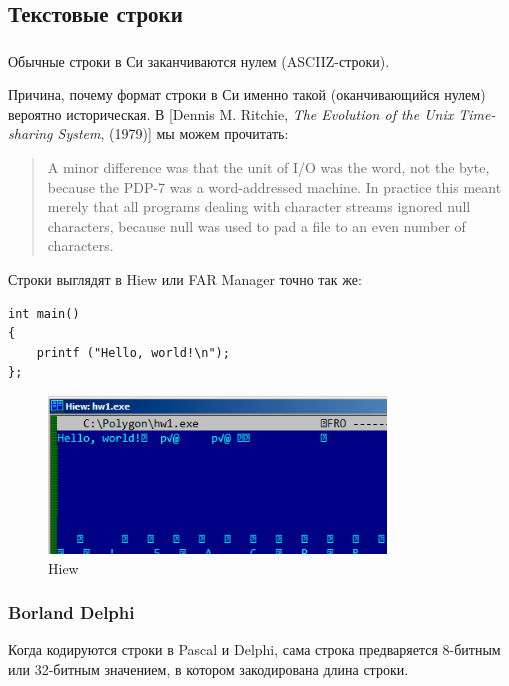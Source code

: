 \subsection{Текстовые строки}

\subsubsection{\CCpp}

\label{C_strings}
Обычные строки в Си заканчиваются нулем (\ac{ASCIIZ}-строки).

Причина, почему формат строки в Си именно такой (оканчивающийся нулем) вероятно историческая.
В [Dennis M. Ritchie, \emph{The Evolution of the Unix Time-sharing System}, (1979)]
мы можем прочитать:

\begin{framed}
\begin{quotation}
A minor difference was that the unit of I/O was the word, not the byte, because the PDP-7 was a word-addressed
machine. In practice this meant merely that all programs dealing with character streams ignored null
characters, because null was used to pad a file to an even number of characters.
\end{quotation}
\end{framed}

Строки выглядят в Hiew или FAR Manager точно так же:

\begin{lstlisting}[style=customc]
int main()
{
	printf ("Hello, world!\n");
};
\end{lstlisting}

\begin{figure}[H]
\centering
\includegraphics[width=0.8\textwidth]{digging_into_code/strings/C-string.png}
\caption{Hiew}
\end{figure}


\subsubsection{Borland Delphi}
Когда кодируются строки в Pascal и Delphi, сама строка предваряется 8-битным или 32-битным значением, в котором закодирована длина строки.

